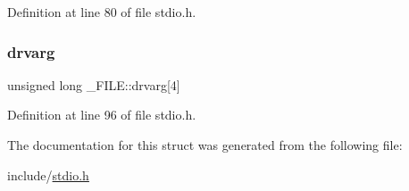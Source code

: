 Definition at line 80 of file stdio.\+h.

\mbox{\label{struct__FILE_ad5c3b4d5c9039aee527eab7244b697b7}} 
\subsubsection{\texorpdfstring{drvarg}{drvarg}}
{\footnotesize\ttfamily unsigned long \+\_\+\+F\+I\+L\+E\+::drvarg\mbox{[}4\mbox{]}}



Definition at line 96 of file stdio.\+h.



The documentation for this struct was generated from the following file\+:\begin{DoxyCompactItemize}
\item 
include/\mbox{\hyperlink{stdio_8h}{stdio.\+h}}\end{DoxyCompactItemize}
